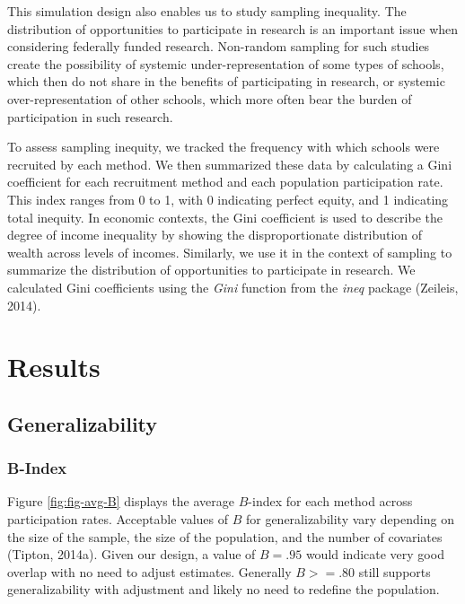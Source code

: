 \documentclass[
  english,
  man,floatsintext]{apa6}
\begin{document}
This simulation design also enables us to study sampling inequality. The distribution of opportunities to participate in research is an important issue when considering federally funded research.
Non-random sampling for such studies create the possibility of systemic under-representation of some types of schools, which then do not share in the benefits of participating in research, or systemic over-representation of other schools, which more often bear the burden of participation in such research.

To assess sampling inequity, we tracked the frequency with which schools were recruited by each method. We then summarized these data by calculating a Gini coefficient for each recruitment method and each population participation rate. This index ranges from 0 to 1, with 0 indicating perfect equity, and 1 indicating total inequity.
In economic contexts, the Gini coefficient is used to describe the degree of income inequality by showing the disproportionate distribution of wealth across levels of incomes. Similarly, we use it in the context of sampling to summarize the distribution of opportunities to participate in research. We calculated Gini coefficients using the \emph{Gini} function from the \emph{ineq} package (Zeileis, 2014).

\hypertarget{results}{%
\section{Results}\label{results}}

\hypertarget{generalizability-1}{%
\subsection{Generalizability}\label{generalizability-1}}

\hypertarget{b-index}{%
\subsubsection{B-Index}\label{b-index}}

Figure \ref{fig:fig-avg-B} displays the average \(B\)-index for each method across participation rates. Acceptable values of \(B\) for generalizability vary depending on the size of the sample, the size of the population, and the number of covariates (Tipton, 2014a). Given our design, a value of \(B = .95\) would indicate very good overlap with no need to adjust estimates. Generally \(B >= .80\) still supports generalizability with adjustment and likely no need to redefine the population.
\end{document}
